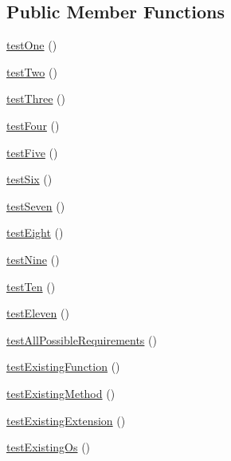 \subsection*{Public Member Functions}
\begin{DoxyCompactItemize}
\item 
\mbox{\hyperlink{class_requirements_test_afbf3ff88b322c6a7197ce02297cd23a0}{test\+One}} ()
\item 
\mbox{\hyperlink{class_requirements_test_a4fb9974ce113d5d1db8075e0db0dc9b6}{test\+Two}} ()
\item 
\mbox{\hyperlink{class_requirements_test_a0bd6c752e665cd0e690512ca38d15d41}{test\+Three}} ()
\item 
\mbox{\hyperlink{class_requirements_test_a610ae959d988c18c588f47517f6a291f}{test\+Four}} ()
\item 
\mbox{\hyperlink{class_requirements_test_a0756440631c4db21ab3607063465834a}{test\+Five}} ()
\item 
\mbox{\hyperlink{class_requirements_test_ace022eea5b5fa83b441021bf6337a76b}{test\+Six}} ()
\item 
\mbox{\hyperlink{class_requirements_test_afac89d452a2d5de36e0051d1ed758b24}{test\+Seven}} ()
\item 
\mbox{\hyperlink{class_requirements_test_a9716ac1cbf30a1f6df13338c87f06191}{test\+Eight}} ()
\item 
\mbox{\hyperlink{class_requirements_test_a80538b5f401ca6c091eabea9fb507c00}{test\+Nine}} ()
\item 
\mbox{\hyperlink{class_requirements_test_a67f6b3c438c2f1e1839760436c20fc96}{test\+Ten}} ()
\item 
\mbox{\hyperlink{class_requirements_test_a67cc5b333f1a93b2dff68dc82557d185}{test\+Eleven}} ()
\item 
\mbox{\hyperlink{class_requirements_test_aac5e45e24fef82f22b85948e86c73a65}{test\+All\+Possible\+Requirements}} ()
\item 
\mbox{\hyperlink{class_requirements_test_a1f90e59b22b569a1f89034d8d2d92194}{test\+Existing\+Function}} ()
\item 
\mbox{\hyperlink{class_requirements_test_a40dd734a2882c132306b7e9921826d21}{test\+Existing\+Method}} ()
\item 
\mbox{\hyperlink{class_requirements_test_af310037caf17c5fe9da92b8ecd190e4f}{test\+Existing\+Extension}} ()
\item 
\mbox{\hyperlink{class_requirements_test_a816c6dbb80667a212de77cadf1099197}{test\+Existing\+Os}} ()
\item 

\end{DoxyCompactItemize}
